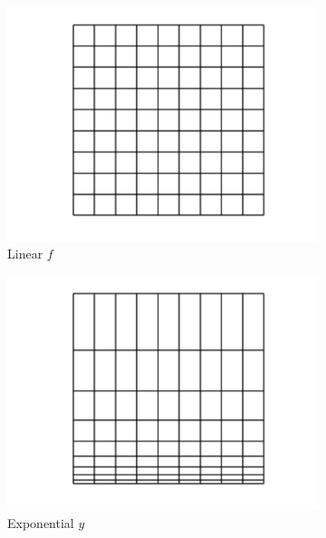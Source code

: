 \begin{figure}[ht]
    \centering
    \begin{subfigure}[b]{0.32\textwidth}
        \centering
        \includegraphics[width=\textwidth]{report/Images/Theory/transfinite/transfinite_1.png}
        \caption{Linear $f$}
        \label{fig:trans1}
    \end{subfigure}
    \begin{subfigure}[b]{0.32\textwidth}
        \centering
        \includegraphics[width=\textwidth]{report/Images/Theory/transfinite/transfinite_2.png}
        \caption{Exponential $y$}
        \label{fig:trans2}
    \end{subfigure}
    \begin{subfigure}[b]{0.32\textwidth}

\end{subfigure}
\end{figure}
